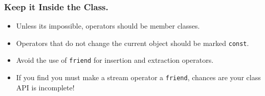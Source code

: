 \documentclass{beamer}
\begin{document}
\begin{frame}
    \frametitle{Keep it Inside the Class.}
    \begin{itemize}[<+->]
        \item Unless its impossible, operators should be member classes.
        \item Operators that do not change the current object should be 
            marked {\tt const}.
        \item Avoid the use of {\tt friend} for insertion and extraction
            operators.
        \item If you find you must make a stream operator a {\tt friend},
            chances are your class API is incomplete!
    \end{itemize}
\end{frame}
\end{document}
